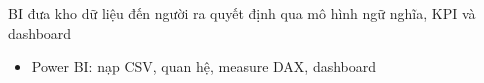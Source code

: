 \begin{frame}{BI đưa kho dữ liệu đến người ra quyết định qua mô hình ngữ nghĩa, KPI và dashboard}
\begin{itemize}
  \item Power BI: nạp CSV, quan hệ, measure DAX, dashboard
\end{itemize}

\end{frame}
